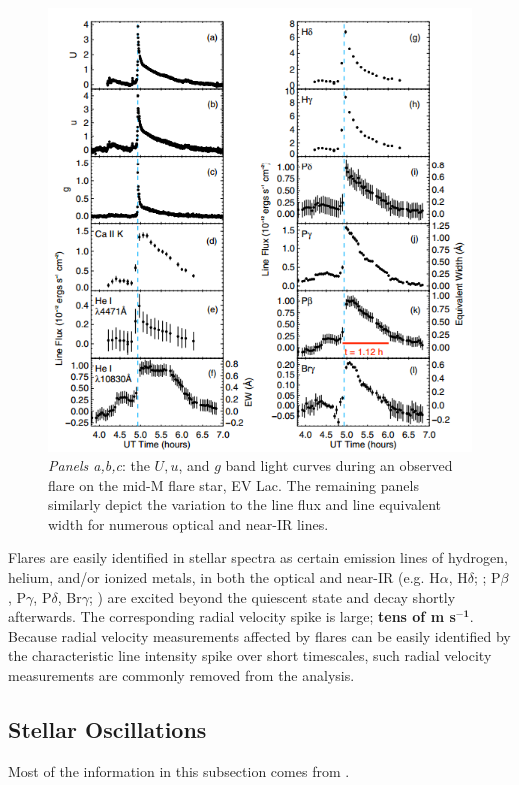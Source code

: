 \begin{figure}
\centering
\includegraphics[scale=.6]{figures/flarelines.png}
\caption{\emph{Panels a,b,c}: the $U,u$, and $g$ band light curves during an 
observed flare on the mid-M flare star, EV Lac. The remaining panels similarly 
depict the variation to the line flux and line equivalent width 
for numerous optical and near-IR lines. 
\parencite[Image credit:][]{schmidt12} \label{fig:flare}}
\end{figure}

Flares are easily identified in stellar spectra as certain emission lines of 
hydrogen, helium, and/or ionized metals, 
in both the optical and near-IR (e.g. H$\alpha$, H$\delta$; 
\cite{reiners09}; P$\beta$, P$\gamma$, P$\delta$, Br$\gamma$; 
\cite{schmidt12}) are 
excited beyond the quiescent state and decay shortly afterwards. 
The corresponding radial velocity spike is large; 
\textbf{tens of m s$^{\mathbf{-1}}$}. Because radial velocity 
measurements affected by flares can be easily identified by the characteristic 
line intensity spike over short timescales, such radial velocity 
measurements are commonly removed from the analysis.

\subsection{Stellar Oscillations}
Most of the information in this subsection comes from \cite{christensen14}. \\

